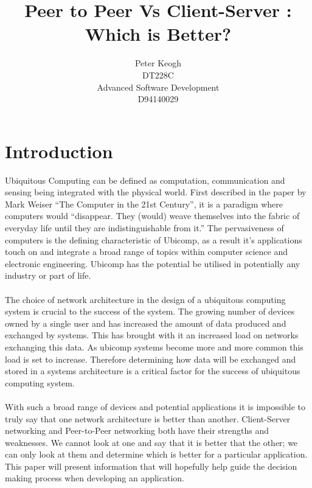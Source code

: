 \documentclass[11pt]{amsart}
\title{Peer to Peer Vs Client-Server : Which is Better?}
\author{
Peter Keogh
\\DT228C
\\Advanced Software Development
\\D94140029
}
\date{}
\begin{document}
\maketitle

\section{Introduction}

Ubiquitous Computing can be defined as computation, communication and sensing being integrated with the physical world. First described in the paper by Mark Weiser ``The Computer in the 21st Century'', it is a paradigm where computers would ``disappear. They (would) weave themselves into the fabric of everyday life until they are indistinguishable from it.''\cite{Weiser} The pervasiveness of computers is the defining characteristic of Ubicomp, as a result it's applications touch on and integrate a broad range of topics within computer science and electronic engineering. Ubicomp has the potential be utilised in potentially any industry or part of life. 
\paragraph{}

The choice of network architecture in the design of a ubiquitous computing system is crucial to the success of the system. The growing number of devices owned by a single user and has increased the amount of data produced and exchanged by systems. This has brought with it an increased load on networks exchanging this data. As ubicomp systems become more and more common this load is set to increase. Therefore determining how data will be exchanged and stored in a systems architecture is a critical factor for the success of ubiquitous computing system. 
\paragraph{}

With such a broad range of devices and potential applications it is impossible to truly say that one network architecture is better than another. Client-Server networking and Peer-to-Peer networking both have their strengths and weaknesses. We cannot look at one and say that it is better that the other; we can only look at them and determine which is better for a particular application. This paper will present information that will hopefully help guide the decision making process when developing an application.
\end{document}
